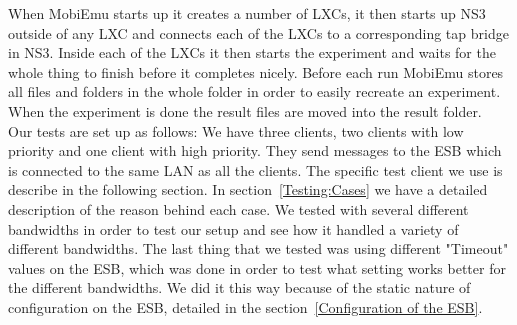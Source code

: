     When MobiEmu starts up it creates a number of LXCs, it then starts up NS3 outside of any LXC and connects each of the LXCs to a corresponding tap bridge in NS3. Inside each of the LXCs it then starts the experiment and waits for the whole thing to finish before it completes nicely. Before each run MobiEmu stores all files and folders in the whole folder in order to easily recreate an experiment. When the experiment is done the result files are moved into the result folder. \\
    
    Our tests are set up as follows: We have three clients, two clients with low priority and one client with high priority. They send messages to the ESB which is connected to the same LAN as all the clients. The specific test client we use is describe in the following section. In section~\ref{Testing:Cases} we have a detailed description of the reason behind each case. We tested with several different bandwidths in order to test our setup and see how it handled a variety of different bandwidths. The last thing that we tested was using different "Timeout" values on the ESB, which was done in order to test what setting works better for the different bandwidths. We did it this way because of the static nature of configuration on the ESB, detailed in the section~\ref{Configuration of the ESB}.
